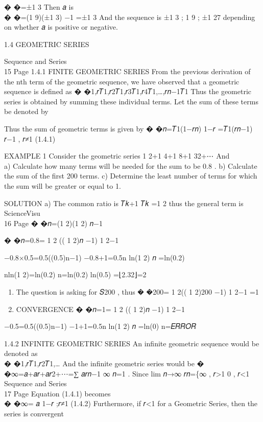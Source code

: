 \documentclass[
  letterpaper,
  DIV=11,
  numbers=noendperiod]{scrreprt}
\providecommand{\tightlist}{%
  \setlength{\itemsep}{0pt}\setlength{\parskip}{0pt}}\usepackage{longtable,booktabs,array}
\begin{document}
� �=±1 3 Then 𝑎 is\\
� �=(1 9)(±1 3) −1 =±1 3 And the sequence is ±1 3 ; 1 9 ; ±1 27
depending on whether 𝑎 is positive or negative.

1.4 GEOMETRIC SERIES

Sequence and Series\\
15 \textbar{} Page 1.4.1 FINITE GEOMETRIC SERIES From the previous
derivation of the nth term of the geometric sequence, we have observed
that a geometric sequence is defined as �
�1,𝑟𝑇1,𝑟2𝑇1,𝑟3𝑇1,𝑟4𝑇1,\ldots,𝑟𝑛−1𝑇1 Thus the geometric series is
obtained by summing these individual terms. Let the sum of these terms
be denoted by

Thus the sum of geometric terms is given by � �𝑛=𝑇1(1−𝑟𝑛) 1−𝑟 =𝑇1(𝑟𝑛−1)
𝑟−1 , 𝑟≠1 (1.4.1)

EXAMPLE 1 Consider the geometric series 1 2+1 4+1 8+1 32+⋯ And\\
a) Calculate how many terms will be needed for the sum to be 0.8 . b)
Calculate the sum of the first 200 terms. c) Determine the least number
of terms for which the sum will be greater or equal to 1.

SOLUTION a) The common ratio is 𝑇𝑘+1 𝑇𝑘 =1 2 thus the general term is
ScienceVisu\\
16 \textbar{} Page � �𝑛=(1 2)(1 2) 𝑛−1

� �𝑛=0.8= 1 2 (( 1 2)𝑛 −1) 1 2−1

−0.8×0.5=0.5((0.5)n−1) −0.8+1=0.5n ln(1 2) 𝑛 =ln(0.2)

nln(1 2)=ln(0.2) n=ln(0.2) ln(0.5) =⌊2.32⌋=2

\begin{enumerate}
\def\labelenumi{\alph{enumi})}
\setcounter{enumi}{1}
\tightlist
\item
  The question is asking for 𝑆200 , thus � �200= 1 2(( 1 2)200 −1) 1 2−1
  =1
\item
  CONVERGENCE � �𝑛=1= 1 2 (( 1 2)𝑛 −1) 1 2−1
\end{enumerate}

−0.5=0.5((0.5)n−1) −1+1=0.5n ln(1 2) 𝑛 =ln(0) n=𝐸𝑅𝑅𝑂𝑅

1.4.2 INFINITE GEOMETRIC SERIES An infinite geometric sequence would be
denoted as\\
� �1,𝑟𝑇1,𝑟2𝑇1,\ldots{} And the infinite geometric series would be �
�∞=𝑎+𝑎𝑟+𝑎𝑟2+⋯=∑ 𝑎𝑟𝑛−1 ∞ 𝑛=1 . Since lim 𝑛→∞ 𝑟𝑛=\{∞ , 𝑟\textgreater1 0 ,
\textbar 𝑟\textbar\textless1 Sequence and Series\\
17 \textbar{} Page Equation (1.4.1) becomes\\
� �∞= 𝑎 1−𝑟 ;𝑟≠1 (1.4.2) Furthermore, if \textbar 𝑟\textbar\textless1
for a Geometric Series, then the series is convergent
\end{document}
